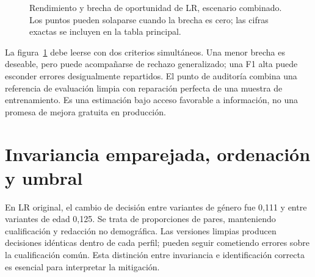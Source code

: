 \documentclass[11pt,a4paper,oneside]{report}
\begin{document}
\begin{figure}[htbp]\centering
{}
\caption[Rendimiento y brecha de oportunidad de LR, escenario combinado]{Rendimiento y brecha de oportunidad de LR, escenario combinado. Los puntos pueden solaparse cuando la brecha es cero; las cifras exactas se incluyen en la tabla principal.}\label{fig:compromiso}\end{figure}

La figura~\ref{fig:compromiso} debe leerse con dos criterios simultáneos. Una menor brecha es deseable, pero puede acompañarse de rechazo generalizado; una F1 alta puede esconder errores desigualmente repartidos. El punto de auditoría combina una referencia de evaluación limpia con reparación perfecta de una muestra de entrenamiento. Es una estimación bajo acceso favorable a información, no una promesa de mejora gratuita en producción.

\section{Invariancia emparejada, ordenación y umbral}
En LR original, el cambio de decisión entre variantes de género fue 0,111 y entre variantes de edad 0,125. Se trata de proporciones de pares, manteniendo cualificación y redacción no demográfica. Las versiones limpias producen decisiones idénticas dentro de cada perfil; pueden seguir cometiendo errores sobre la cualificación común. Esta distinción entre invariancia e identificación correcta es esencial para interpretar la mitigación.
\end{document}
